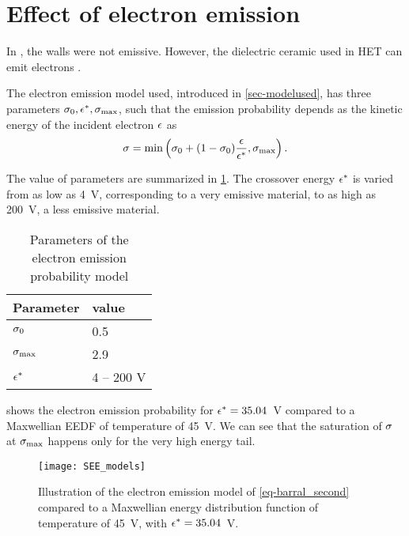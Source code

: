 
\section{Effect of electron emission}
  \label{sec-see}
  
  In , the walls were not emissive.
  However, the dielectric ceramic used in \ac{HET} can emit electrons \citep{villemant,barral2003a}.
  
  The electron emission model used, introduced in \cref{sec-modelused}, has three parameters $\sigma _0, \epsilon^{*}, \sigma _{\rm max} $, such that the emission probability depends as the kinetic energy of the incident electron $\epsilon$ as
  \begin{equation} \label{eq-barral_second}
    \sigma  = \min \left( \sigma _0 + (1 -  \sigma _0) \frac{\epsilon}{\epsilon^{*}}, \sigma _{\rm max}     \right).
  \end{equation}
  
  The value of parameters are summarized in \cref{tab-tabe_parameters_see}.
  The crossover energy $\epsilon^{*}$ is varied from as low as 4~V, corresponding to a very emissive material, to as high as 200~V, a less emissive material.
  
  \begin{table}[hbtp]
    \centering
    \caption{Parameters of the electron emission probability model}
    \label{tab-tabe_parameters_see}
    \begin{tabular}{@{}ll@{}} \toprule
    Parameter & value  \\ \midrule
    $\sigma _0$ & 0.5  \\
    $\sigma _{\rm max} $ & 2.9 \\
    $\epsilon^{*}$   &  4  -- 200 V\\
    \bottomrule
    \end{tabular}
  \end{table}
  
   shows the electron emission probability for $\epsilon^{*}=35.04$~V compared to a Maxwellian \ac{EEDF} of temperature of 45~V.
  We can see that the saturation of $\sigma $ at $\sigma _{\rm max} $ happens only for the very high energy tail.
  
  \begin{figure}[hbtp]
    \centering
    \texttt{[image: SEE\_models]}
    \caption{Illustration of the electron emission model of \cref{eq-barral_second} compared to a Maxwellian energy distribution function of temperature of 45~V, with $\epsilon^{*}=35.04$~V.}
    \label{fig-see_illustration}
  \end{figure}
  
